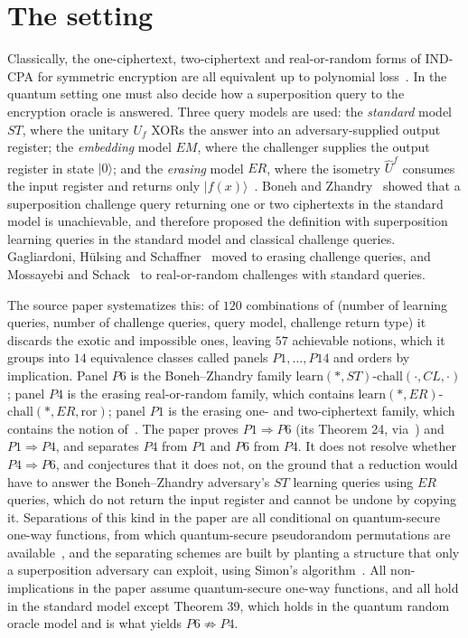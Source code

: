 \documentclass{aicr-conjecture}
\newcommand{\ror}{\mathrm{ror}}
\newcommand{\learn}{\mathrm{learn}}
\newcommand{\chall}{\mathrm{chall}}
\newcommand{\ket}[1]{|#1\rangle}
\newcommand{\NERror}{\ensuremath{\learn(*,ER)}-\ensuremath{\chall(*,ER,\ror)}}
\begin{document}
\section{The setting}\label{sec:setting}

Classically, the one-ciphertext, two-ciphertext and real-or-random forms
of IND-CPA for symmetric encryption are all equivalent up to polynomial
loss~\cite{BDJR97}. In the quantum setting one must also decide how a
superposition query to the encryption oracle is answered. Three query
models are used: the \emph{standard} model $ST$, where the unitary $U_f$
XORs the answer into an adversary-supplied output register; the
\emph{embedding} model $EM$, where the challenger supplies the output
register in state $\ket{0}$; and the \emph{erasing} model $ER$, where
the isometry $\hat U^{f}$ consumes the input register and returns only
$\ket{f(x)}$~\cite{KKVB02}. Boneh and Zhandry~\cite{BZ13b} showed that a
superposition challenge query returning one or two ciphertexts in the
standard model is unachievable, and therefore proposed the definition
with superposition learning queries in the standard model and classical
challenge queries. Gagliardoni, H\"ulsing and Schaffner~\cite{GHS16}
moved to erasing challenge queries, and Mossayebi and
Schack~\cite{MS16} to real-or-random challenges with standard queries.

The source paper systematizes this: of $120$ combinations of (number of
learning queries, number of challenge queries, query model, challenge
return type) it discards the exotic and impossible ones, leaving $57$
achievable notions, which it groups into $14$ equivalence classes called
panels $P1,\dots,P14$ and orders by implication. Panel $P6$ is the
Boneh--Zhandry family $\learn(*,ST)$-$\chall(\cdot,CL,\cdot)$; panel
$P4$ is the erasing real-or-random family, which contains \NERror;
panel $P1$ is the erasing one- and two-ciphertext family, which contains
the notion of~\cite{GHS16}. The paper proves $P1\Rightarrow P6$ (its
Theorem 24, via~\cite{GHS16}) and $P1\Rightarrow P4$, and separates $P4$
from $P1$ and $P6$ from $P4$. It does not resolve whether
$P4\Rightarrow P6$, and conjectures that it does not, on the ground that
a reduction would have to answer the Boneh--Zhandry adversary's $ST$
learning queries using $ER$ queries, which do not return the input
register and cannot be undone by copying it. Separations of this kind in
the paper are all conditional on quantum-secure one-way functions, from
which quantum-secure pseudorandom permutations are
available~\cite{Zha16}, and the separating schemes are built by planting
a structure that only a superposition adversary can exploit, using
Simon's algorithm~\cite{Sim97}. All non-implications in the paper assume
quantum-secure one-way functions, and all hold in the standard model
except Theorem 39, which holds in the quantum random oracle model and is
what yields $P6\not\Rightarrow P4$.
\end{document}
